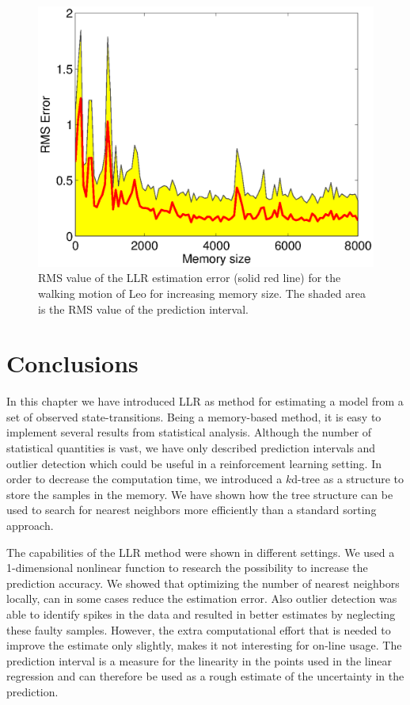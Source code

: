 \begin{figure}[htbp]
	\centering
		\includegraphics[width=.5\textwidth]{Figures/LLR-LeoIncrMemError}
	\caption[Estimation error for robot Leo for increasing memory size]{\ac{RMS} value of the \ac{LLR} estimation error (solid red line) for the walking motion of Leo for increasing memory size. The shaded area is the \ac{RMS} value of the prediction interval.}
	\label{fig:LLR-LeoIncrMemError}
\end{figure}







\section{Conclusions}\label{sec:LLR-conclusion}
In this chapter we have introduced \acl{LLR} as method for estimating a model from a set of observed state-transitions. Being a memory-based method, it is easy to implement several results from statistical analysis. Although the number of statistical quantities is vast, we have only described prediction intervals and outlier detection which could be useful in a reinforcement learning setting. In order to decrease the computation time, we introduced a $k$d-tree as a structure to store the samples in the memory. We have shown how the tree structure can be used to search for nearest neighbors more efficiently than a standard sorting approach. 

The capabilities of the \ac{LLR} method were shown in different settings. We used a 1-dimensional nonlinear function to research the possibility to increase the prediction accuracy. We showed that optimizing the number of nearest neighbors locally, can in some cases reduce the estimation error. Also outlier detection was able to identify spikes in the data and resulted in better estimates by neglecting these faulty samples. However, the extra computational effort that is needed to improve the estimate only slightly, makes it not interesting for on-line usage. The prediction interval is a measure for the linearity in the points used in the linear regression and can therefore be used as a rough estimate of the uncertainty in the prediction. 

